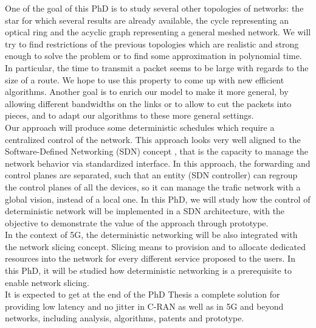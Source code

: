\documentclass{article}
\begin{document}
One of the goal of this PhD is to study several other topologies of networks: the star for which several results are already available, the cycle representing an optical ring and the acyclic graph representing a general meshed network. We will try to find restrictions of the previous topologies which are realistic and strong enough to solve the problem or to find some approximation in polynomial time. In particular, the time to transmit a packet seems to be large with regards to the size of a route. We hope to use this property to come up with new efficient algorithms.
Another goal is to enrich our model to make it more general, by allowing different bandwidths on the links or to allow to cut the packets into pieces, and to adapt our algorithms to these more general settings.\\

Our approach will produce some deterministic schedules which require a centralized control of the network. This approach looks very well aligned to the Software-Defined Networking (SDN) concept \cite{haleplidis2015software}, that is the capacity to manage the network behavior via standardized interface. In this approach, the forwarding and control planes are separated, such that an entity (SDN controller) can regroup the control planes of all the devices, so it can manage the trafic network with a global vision, instead of a local one. In this PhD, we will study how the control of deterministic network will be implemented in a SDN architecture, with the objective to demonstrate the value of the approach through prototype.\\

In the context of 5G, the deterministic networking will be also integrated with the network slicing concept. Slicing means to provision and to allocate dedicated resources into the network for every different service proposed to the users.  In this PhD, it will be studied how deterministic networking is a prerequisite to enable network slicing.\\

It is expected to get at the end of the PhD Thesis a complete solution for providing low latency and no jitter  in C-RAN as well as in 5G and beyond networks, including analysis, algorithms, patents and prototype.\\
\end{document}
